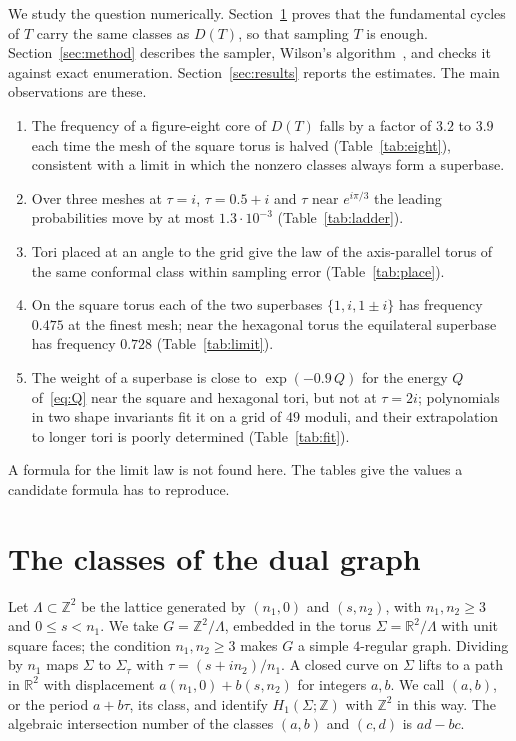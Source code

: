 \documentclass[11pt]{amsart}
\theoremstyle{definition}
\theoremstyle{remark}
\newcommand{\Z}{\mathbb{Z}}
\newcommand{\R}{\mathbb{R}}
\begin{document}
We study the question numerically. Section~\ref{sec:struct} proves that the fundamental cycles of $T$ carry the same
classes as $D(T)$, so that sampling $T$ is enough. Section~\ref{sec:method} describes the sampler, Wilson's
algorithm~\cite{Wil96}, and checks it against exact enumeration. Section~\ref{sec:results} reports the estimates. The
main observations are these.
\begin{enumerate}
\item The frequency of a figure-eight core of $D(T)$ falls by a factor of $3.2$ to $3.9$ each time the mesh of the
square torus is halved (Table~\ref{tab:eight}), consistent with a limit in which the nonzero classes always form a superbase.
\item Over three meshes at $\tau=i$, $\tau=0.5+i$ and $\tau$ near $e^{i\pi/3}$ the leading probabilities move by at most
$1.3\cdot10^{-3}$ (Table~\ref{tab:ladder}).
\item Tori placed at an angle to the grid give the law of the axis-parallel torus of the same conformal class within
sampling error (Table~\ref{tab:place}).
\item On the square torus each of the two superbases $\{1,i,1\pm i\}$ has frequency $0.475$ at the finest mesh; near
the hexagonal torus the equilateral superbase has frequency $0.728$ (Table~\ref{tab:limit}).
\item The weight of a superbase is close to $\exp(-0.9\,Q)$ for the energy $Q$ of~\eqref{eq:Q} near the square and
hexagonal tori, but not at $\tau=2i$; polynomials in two shape invariants fit it on a grid of $49$ moduli, and their
extrapolation to longer tori is poorly determined (Table~\ref{tab:fit}).
\end{enumerate}
A formula for the limit law is not found here. The tables give the values a candidate formula has to reproduce.

\section{The classes of the dual graph}\label{sec:struct}

Let $\Lambda\subset\Z^2$ be the lattice generated by $(n_1,0)$ and $(s,n_2)$, with $n_1,n_2\ge3$ and $0\le s<n_1$. We
take $G=\Z^2/\Lambda$, embedded in the torus $\Sigma=\R^2/\Lambda$ with unit square faces; the condition $n_1,n_2\ge3$
makes $G$ a simple $4$-regular graph. Dividing by $n_1$ maps $\Sigma$ to $\Sigma_\tau$ with $\tau=(s+in_2)/n_1$. A
closed curve on $\Sigma$ lifts to a path in $\R^2$ with displacement $a(n_1,0)+b(s,n_2)$ for integers $a,b$. We call
$(a,b)$, or the period $a+b\tau$, its class, and identify $H_1(\Sigma;\Z)$ with $\Z^2$ in this way. The algebraic
intersection number of the classes $(a,b)$ and $(c,d)$ is $ad-bc$.
\end{document}
